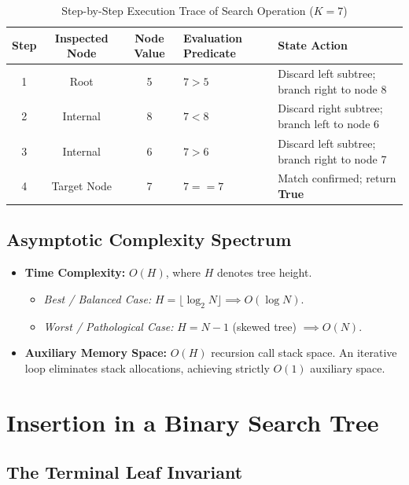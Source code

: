 \documentclass[10pt,journal,compsoc,onecolumn]{IEEEtran}
\begin{document}
\begin{table}[htbp]
\centering
\caption{Step-by-Step Execution Trace of Search Operation ($K = 7$)}
\label{tab:search_trace}
\begin{tabular}{ccclp{5.0cm}}
\toprule
\textbf{Step} & \textbf{Inspected Node} & \textbf{Node Value} & \textbf{Evaluation Predicate} & \textbf{State Action} \\
\midrule
1 & Root & 5 & $7 > 5$ & Discard left subtree; branch right to node 8 \\
2 & Internal & 8 & $7 < 8$ & Discard right subtree; branch left to node 6 \\
3 & Internal & 6 & $7 > 6$ & Discard left subtree; branch right to node 7 \\
4 & Target Node & 7 & $7 == 7$ & Match confirmed; return \textbf{True} \\
\bottomrule
\end{tabular}
\end{table}

\subsection{Asymptotic Complexity Spectrum}
\begin{itemize}
    \item \textbf{Time Complexity:} $O(H)$, where $H$ denotes tree height.
    \begin{itemize}
        \item \emph{Best / Balanced Case:} $H = \lfloor \log_2 N \rfloor \implies O(\log N)$.
        \item \emph{Worst / Pathological Case:} $H = N - 1$ (skewed tree) $\implies O(N)$.
    \end{itemize}
    \item \textbf{Auxiliary Memory Space:} $O(H)$ recursion call stack space. An iterative loop eliminates stack allocations, achieving strictly $O(1)$ auxiliary space.
\end{itemize}

\section{Insertion in a Binary Search Tree}
\label{sec:insert}

\subsection{The Terminal Leaf Invariant}
\end{document}
